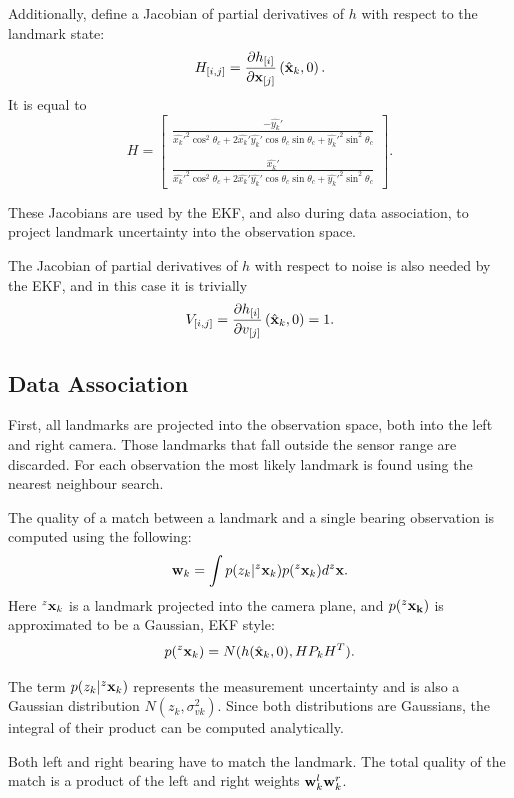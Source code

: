 Additionally, define a Jacobian of partial derivatives of $h$ with
respect to the landmark state:
$$
H_{[i,j]} = \frac{\partial h_{[i]}}{\partial {\bf x}_{[j]}}
             \left(\hat{\bf x}_k , 0 \right).
$$
It is equal to
$$
  H = \left[ 
\begin{array}{c}
\frac{-\hat{y_k}'}
{\hat{x_k}'^2 \cos^2 \theta_c + 2\hat{x_k}'\hat{y_k}'\cos\theta_c\sin\theta_c + \hat{y_k}'^2\sin^2  \theta_c }\\
{}\\
\frac{\hat{x_k}'}
{\hat{x_k}'^2 \cos^2 \theta_c + 2\hat{x_k}'\hat{y_k}'\cos\theta_c\sin\theta_c + \hat{y_k}'^2\sin^2 \theta_c }
\end{array}
      \right].
$$

These Jacobians are used by the EKF, and also during data association,
to project landmark uncertainty into the observation space.

The Jacobian of partial derivatives of $h$ with respect
to noise is also needed by the EKF, and in this case it is trivially
$$
V_{[i,j]} = \frac{\partial h_{[i]}}{\partial v_{[j]}}
             \left(\hat{\bf x}_k , 0 \right) = 1.
$$


\subsection{Data Association}

First, all landmarks are projected into the observation space, both
into the left and right camera. Those landmarks that fall outside the
sensor range are discarded. For each observation the most likely
landmark is found using the nearest neighbour search. 

The quality of a match between a landmark and a single bearing
observation is computed using the following:
$$
  {\bf w}_k = \int p(z_k|^z{\bf x}_k)p(^z{\bf x}_k) d^z{\bf x}.
$$
Here $^z{\bf x}_k$ is a landmark projected into the camera plane, and
$p(^z{\bf x_k})$ is approximated to be a Gaussian, EKF style:
$$
p(^z{\bf x}_k) = N(h(\hat{\bf x}_k,0), H P_k H^T).
$$

The term $p(z_k|^z{\bf x}_k)$ represents the measurement uncertainty
and is also a Gaussian distribution $N(z_k ,\sigma^2_{vk})$. Since
both distributions are Gaussians, the integral of their product can be
computed analytically.

Both left and right bearing have to match the landmark. The total
quality of the match is a product of the left and right weights ${\bf
  w}^l_k{\bf w}^r _k$.

